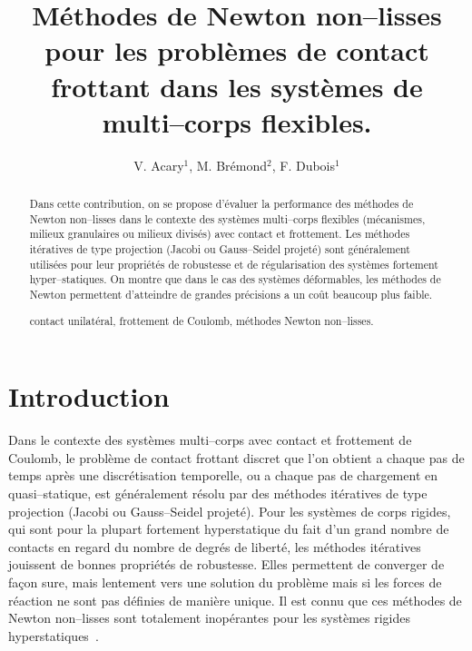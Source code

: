 \documentclass{CSMA2017}
\title{Méthodes de Newton non--lisses pour les problèmes de contact frottant dans les systèmes de multi--corps flexibles.}
\author{V. Acary$^1$, M. Brémond$^2$, F. Dubois$^1$}
\begin{document}
\maketitle

\begin{abstract}
Dans cette contribution, on se propose d'évaluer la performance des méthodes de Newton non--lisses dans le contexte des systèmes multi--corps flexibles (mécanismes, milieux granulaires ou milieux divisés) avec contact et frottement. Les méthodes itératives de type projection (Jacobi ou Gauss--Seidel projeté) sont généralement utilisées pour leur propriétés de robustesse et de régularisation des systèmes fortement hyper--statiques. On montre que dans le cas des systèmes déformables, les méthodes de Newton permettent d'atteindre de grandes précisions a un coût beaucoup plus faible.

\keywords contact unilatéral, frottement de Coulomb, méthodes Newton non--lisses.
\end{abstract}

\section{Introduction}

Dans le contexte des systèmes multi--corps avec contact et frottement de Coulomb, le problème de contact frottant discret que l'on obtient a chaque pas de temps après une discrétisation temporelle, ou a chaque pas de chargement en quasi--statique, est généralement résolu par des méthodes itératives de type projection (Jacobi ou Gauss--Seidel projeté). 
%
Pour les systèmes de corps rigides, qui sont pour la plupart fortement hyperstatique du fait d'un grand nombre de contacts en regard du nombre de degrés de liberté, les méthodes itératives jouissent de bonnes propriétés de robustesse. Elles permettent de converger de façon sure, mais lentement vers une solution du problème mais si les forces de réaction ne sont pas définies de manière unique. Il est connu que ces méthodes de Newton non--lisses sont totalement inopérantes pour les systèmes rigides hyperstatiques~\cite{bertailsdescoubes:inria-00557706, ??}.
\end{document}
